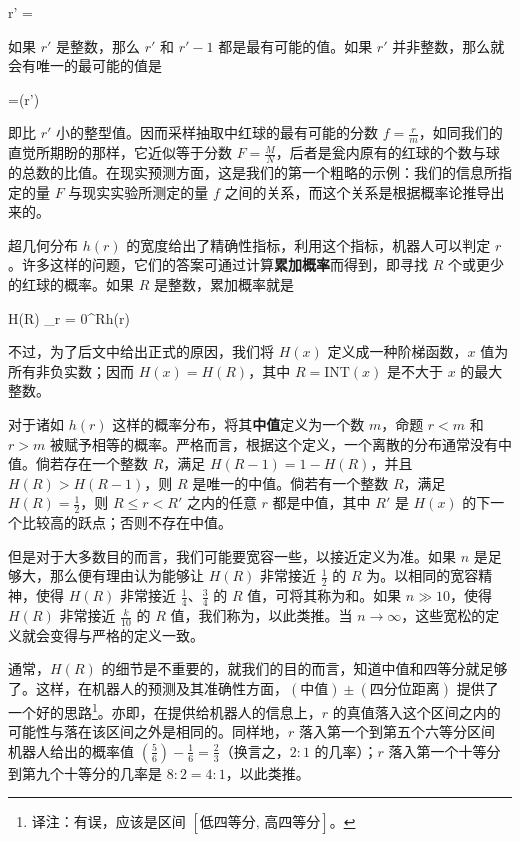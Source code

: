 \placeformula[3-26]
\startformula
r' = 
\stopformula

如果 $r'$ 是整数，那么 $r'$ 和 $r' - 1$ 都是最有可能的值。如果 $r'$ 并非整数，那么就会有唯一的最可能的值是

\placeformula[3-27]
\startformula
{}=(r')
\stopformula

即比 $r'$ 小的整型值。因而采样抽取中红球的最有可能的分数 $f = \frac{r}{m}$，如同我们的直觉所期盼的那样，它近似等于分数 $F = \frac{M}{N}$，后者是瓮内原有的红球的个数与球的总数的比值。在现实预测方面，这是我们的第一个粗略的示例：我们的信息所指定的量 $F$ 与现实实验所测定的量 $f$ 之间的关系，而这个关系是根据概率论推导出来的。

超几何分布 $h(r)$ 的宽度给出了精确性指标，利用这个指标，机器人可以判定 $r$。许多这样的问题，它们的答案可通过计算{\bf 累加概率}而得到，即寻找 $R$ 个或更少的红球的概率。如果 $R$ 是整数，累加概率就是

\placeformula[3-28]
\startformula
H(R) \equiv\sum_{r = 0}^Rh(r)
\stopformula

不过，为了后文中给出正式的原因，我们将 $H(x)$ 定义成一种阶梯函数，$x$ 值为所有非负实数；因而 $H(x)=H(R)$，其中 $R = \text{INT}(x)$ 是不大于 $x$ 的最大整数。

对于诸如 $h(r)$ 这样的概率分布，将其{\bf 中值}定义为一个数 $m$，命题 $r < m$ 和 $r > m$ 被赋予相等的概率。严格而言，根据这个定义，一个离散的分布通常没有中值。倘若存在一个整数 $R$，满足 $H(R - 1) = 1 - H(R)$，并且 $H(R) > H(R - 1)$，则 $R$ 是唯一的中值。倘若有一个整数 $R$，满足 $H(R) = \frac{1}{2}$，则 $R\le r < R'$ 之内的任意 $r$ 都是中值，其中 $R'$ 是 $H(x)$ 的下一个比较高的跃点；否则不存在中值。

但是对于大多数目的而言，我们可能要宽容一些，以接近定义为准。如果 $n$ 是足够大，那么便有理由认为能够让 $H(R)$ 非常接近 $\frac{1}{2}$ 的 $R$ 为。以相同的宽容精神，使得 $H(R)$ 非常接近 $\frac{1}{4}$、$\frac{3}{4}$ 的 $R$ 值，可将其称为和。如果 $n \gg 10$，使得 $H(R)$ 非常接近 $\frac{k}{10}$ 的 $R$ 值，我们称为，以此类推。当 $n \rightarrow \infty$，这些宽松的定义就会变得与严格的定义一致。

通常，$H(R)$ 的细节是不重要的，就我们的目的而言，知道中值和四等分就足够了。这样，在机器人的预测及其准确性方面，$(\text{中值})\pm (\text{四分位距离})$ 提供了一个好的思路\footnote{译注：有误，应该是区间 $[\text{低四等分},\,\text{高四等分}]$。}。亦即，在提供给机器人的信息上，$r$ 的真值落入这个区间之内的可能性与落在该区间之外是相同的。同样地，$r$ 落入第一个到第五个六等分区间 机器人给出的概率值 $(\frac{5}{6}) - \frac{1}{6} = \frac{2}{3}$（换言之，$2:1$ 的几率）；$r$ 落入第一个十等分到第九个十等分的几率是 $8:2 = 4:1$，以此类推。


